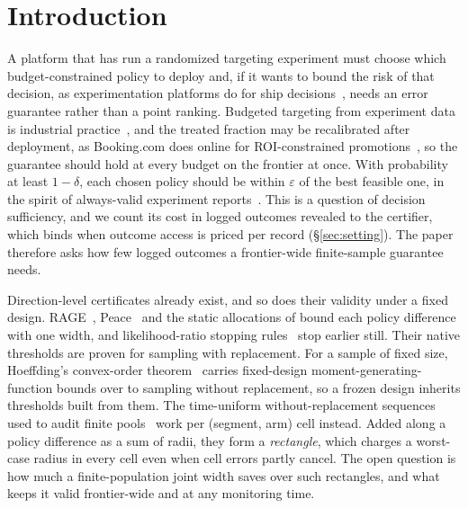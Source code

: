 \documentclass[sigconf,anonymous,review]{acmart}
\newcommand{\eps}{\varepsilon}
\begin{document}

\maketitle

\section{Introduction}\label{sec:intro}

A platform that has run a randomized targeting experiment must choose which budget-constrained policy to deploy and, if it wants to bound the risk of that decision, as experimentation platforms do for ship decisions~\citep{schultzberg2024riskaware}, needs an error guarantee rather than a point ranking. Budgeted targeting from experiment data is industrial practice~\citep{zhao2019uplift,ai2022lbcf}, and the treated fraction may be recalibrated after deployment, as Booking.com does online for ROI-constrained promotions~\citep{goldenberg2020freelunch}, so the guarantee should hold at every budget on the frontier at once. With probability at least $1-\delta$, each chosen policy should be within $\eps$ of the best feasible one, in the spirit of always-valid experiment reports~\citep{johari2017peeking,howard2021time}. This is a question of decision sufficiency, and we count its cost in logged outcomes revealed to the certifier, which binds when outcome access is priced per record (\S\ref{sec:setting}). The paper therefore asks how few logged outcomes a frontier-wide finite-sample guarantee needs.

Direction-level certificates already exist, and so does their validity under a fixed design. RAGE~\citep{fiez2019sequential}, Peace~\citep{katzsamuels2020empirical} and the static allocations of \citet{soare2014best} bound each policy difference with one width, and likelihood-ratio stopping rules~\citep{garivier2016optimal,jourdan2021efficient} stop earlier still. Their native thresholds are proven for sampling with replacement. For a sample of fixed size, Hoeffding's convex-order theorem~\citep{hoeffding1963probability} carries fixed-design moment-generating-function bounds over to sampling without replacement, so a frozen design inherits thresholds built from them. The time-uniform without-replacement sequences used to audit finite pools~\citep{waudbysmith2020confidence,waudbysmith2024estimating} work per (segment, arm) cell instead. Added along a policy difference as a sum of radii, they form a \emph{rectangle}, which charges a worst-case radius in every cell even when cell errors partly cancel. The open question is how much a finite-population joint width saves over such rectangles, and what keeps it valid frontier-wide and at any monitoring time.
\end{document}
